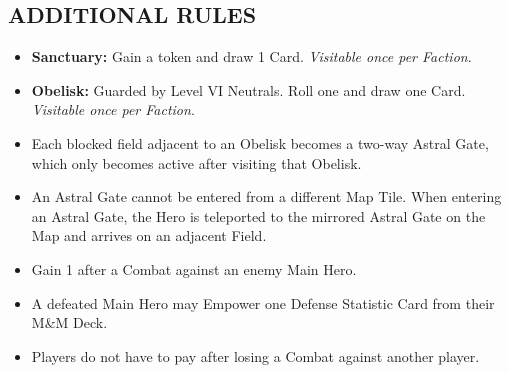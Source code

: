\begin{multicols}{2}

\subsection*{\MakeUppercase{Additional Rules}}
\begin{itemize}
  \item \textbf{Sanctuary:} Gain a  token and draw 1 Card. \textit{Visitable once per Faction}.
  \item \textbf{Obelisk:} Guarded by Level VI Neutrals. Roll one  and draw one Card. \textit{Visitable once per Faction}.
  \item Each blocked field adjacent to an Obelisk becomes a two-way Astral Gate, which only becomes active after visiting that Obelisk.
  \item An Astral Gate cannot be entered from a different Map Tile. When entering an Astral Gate, the Hero is teleported to the mirrored Astral Gate on the Map and arrives on an adjacent Field.
  \item Gain 1  after a Combat against an enemy Main Hero.
  \item A defeated Main Hero may Empower one Defense Statistic Card from their M\&M Deck.
  \item Players do not have to pay  after losing a Combat against another player.
\end{itemize}

\end{multicols}

